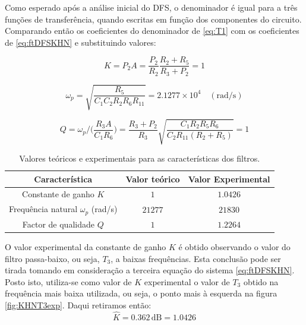 \documentclass[a4paper,11pt]{report}
\begin{document}
Como esperado após a análise inicial do DFS, o denominador é igual para a três funções de transferência, quando escritas em função dos componentes do circuito. Comparando então os coeficientes do denominador de \ref{eq:T1} com os coeficientes de \ref{eq:ftDFSKHN} e substituindo valores:

\begin{equation} \label{eq:KHNKteorico}
K=P_2A=\frac{P_2}{R_2}\frac{R_2+R_5}{R_3+P_2}=1
\end{equation}

\begin{equation} \label{eq:KHNwpteorico}
\omega_p=\sqrt{\frac{R_5}{C_1C_2R_2R_6R_{11}}}=2.1277\times 10^{4} \quad (\textrm{rad/s})
\end{equation}

\begin{equation} \label{eq:KHNQteorico}
Q=\omega_p\bigg/\bigg(\frac{R_3A}{C_1R_6}\bigg)=\dfrac{R_3+P_2}{R_3}\sqrt{\dfrac{C_1R_2R_5R_6}{C_2R_{11}(R_2+R_5)}}=1
\end{equation}

\begin{table}[h]
\centering
\begin{tabular}{||c|c|c||}
\hline
\textbf{Característica}               & \textbf{Valor teórico} & \textbf{Valor Experimental} \\ \hline\hline
Constante de ganho $K$                & $1$                    & $1.0426$                    \\ \hline
Frequência natural $\omega_p$ (rad/s) & $21277$                & $21830$                     \\ \hline
Factor de qualidade $Q$               & $1$                    & $1.2264$                    \\ \hline
\end{tabular}
\caption{Valores teóricos e experimentais para as características dos filtros.\label{tab:KQwpexperimentais}}
\end{table}

O valor experimental da constante de ganho $K$ é obtido observando o valor do filtro passa-baixo, ou seja, $T_3$, a baixas frequências. Esta conclusão pode ser tirada tomando em consideração a terceira equação do sistema \ref{eq:ftDFSKHN}. Posto isto, utiliza-se como valor de $K$ experimental o valor de $T_3$ obtido na frequência mais baixa utilizada, ou seja, o ponto mais à esquerda na figura \ref{fig:KHNT3exp}. Daqui retiramos então:
\[
\widehat{K}=0.362\,\textrm{dB}=1.0426
\]
\end{document}
